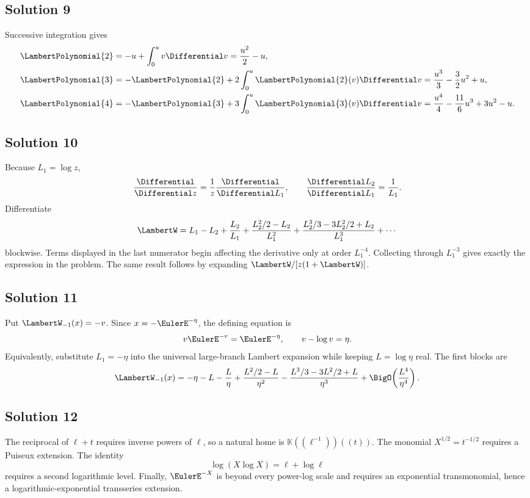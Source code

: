 \documentclass[11pt,oneside,openany]{book}
\newcommand{\K}{\mathbb{K}}
\begin{document}
\subsection*{Solution 9}
Successive integration gives
\begin{align*}
 \LambertPolynomial{2}&=-u+\int_0^u v\Differential v=\frac{u^2}{2}-u,\\
 \LambertPolynomial{3}&=-\LambertPolynomial{2}+2\int_0^u\LambertPolynomial{2}(v)\Differential v
 =\frac{u^3}{3}-\frac32u^2+u,\\
 \LambertPolynomial{4}&=-\LambertPolynomial{3}+3\int_0^u\LambertPolynomial{3}(v)\Differential v
 =\frac{u^4}{4}-\frac{11}{6}u^3+3u^2-u.
\end{align*}

\subsection*{Solution 10}
Because \(L_1=\log z\),
\[
 \frac{\Differential}{\Differential z}=\frac1z\frac{\Differential}{\Differential L_1},
 \qquad
 \frac{\Differential L_2}{\Differential L_1}=\frac1{L_1}.
\]
Differentiate
\[
 \LambertW=L_1-L_2+\frac{L_2}{L_1}
 +\frac{L_2^2/2-L_2}{L_1^2}
 +\frac{L_2^3/3-3L_2^2/2+L_2}{L_1^3}+\cdots
\]
blockwise.  Terms displayed in the last numerator begin affecting the
derivative only at order \(L_1^{-4}\).  Collecting through
\(L_1^{-3}\) gives exactly the expression in the problem.  The same result
follows by expanding \(\LambertW/[z(1+\LambertW)]\).

\subsection*{Solution 11}
Put \(\LambertW_{-1}(x)=-v\).  Since \(x=-\EulerE^{-\eta}\), the defining equation is
\[
 v\EulerE^{-v}=\EulerE^{-\eta},
 \qquad v-\log v=\eta.
\]
Equivalently, substitute \(L_1=-\eta\) into the universal large-branch
Lambert expansion while keeping \(L=\log\eta\) real.  The first blocks are
\[
 \LambertW_{-1}(x)
 =-\eta-L-\frac{L}{\eta}
 +\frac{L^2/2-L}{\eta^2}
 -\frac{L^3/3-3L^2/2+L}{\eta^3}
 +\BigO\!\left(\frac{L^4}{\eta^4}\right).
\]

\subsection*{Solution 12}
The reciprocal of \(\ell+t\) requires inverse powers of \(\ell\), so a
natural home is \(\K((\ell^{-1}))((t))\).  The monomial
\(X^{1/2}=t^{-1/2}\) requires a Puiseux extension.  The identity
\[
 \log(X\log X)=\ell+\log\ell
\]
requires a second logarithmic level.  Finally, \(\EulerE^{-X}\) is beyond every
power-log scale and requires an exponential transmonomial, hence a
logarithmic-exponential transseries extension.
\end{document}
